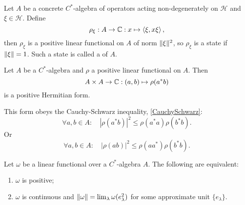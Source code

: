 \begin{example}
Let $A$ be a concrete $C^*$-algebra of operators acting non-degenerately on $\mathcal{H}$ and $\xi \in \mathcal{H}$. Define
\[ \rho_\xi: A \to \mathbb{C}: x\mapsto \left\langle \xi, x\xi \right\rangle, \]
then $\rho_\xi$ is a positive linear functional on $A$ of norm $\lVert\xi\rVert^2$, so  $\rho_\xi$ is a state if $\lVert\xi\rVert =1$. Such a state is called a  of $A$.
\end{example}

\begin{proposition}
Let $A$ be a $C^*$-algebra and $\rho$ a positive linear functional on $A$. Then
\[ A\times A \to \mathbb{C}: (a,b)\mapsto \rho(a^*b) \]
is a positive Hermitian form.
\end{proposition}
\begin{corollary}
This form obeys the Cauchy-Schwarz inequality, \ref{CauchySchwarz}:
\[ \forall a,b\in A:\quad |\rho(a^*b)|^2 \leq \rho(a^*a)\rho(b^*b). \]
Or
\[ \forall a,b\in A:\quad |\rho(ab)|^2 \leq \rho(aa^*)\rho(b^*b). \]
\end{corollary}

\begin{proposition}
Let $\omega$ be a linear functional over a $C^*$-algebra $A$. The following are equivalent:
\begin{enumerate}
\item $\omega$ is positive;
\item $\omega$ is continuous and $\lVert\omega\rVert = \lim_\lambda \omega(e_\lambda^2)$ for some approximate unit $\{e_\lambda\}$.
\end{enumerate}
\end{proposition}

